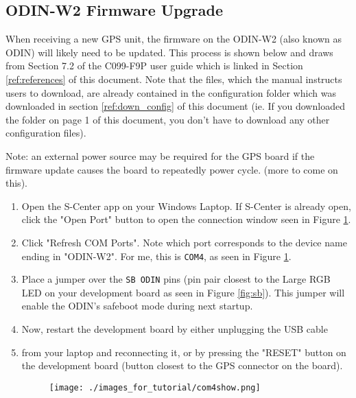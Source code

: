 \documentclass{article}%
\begin{document}
\begin{appendices}


\section{ODIN-W2 Firmware Upgrade}\label{ref:odin_firmware}
	When receiving a new GPS unit, the firmware on the ODIN-W2 (also known as ODIN) will likely need to be updated.  This process is shown below and draws from Section 7.2 of the C099-F9P user guide which is linked in Section \ref{ref:references} of this document.  Note that the files, which the manual instructs users to download, are already contained in the configuration folder which was downloaded in section \ref{ref:down_config} of this document (ie. If you downloaded the folder on page 1 of this document, you don't have to download any other configuration files).
	
	\begin{myquote}
	Note: an external power source may be required for the GPS board if the firmware update causes the board to repeatedly power cycle.	(more to come on this).
	\end{myquote}

	
	\begin{enumerate}
	\item Open the S-Center app on your Windows Laptop.  If S-Center is already open, click the "Open Port" button to open the connection window seen in Figure \ref{fig:com4show}.
	\item Click "Refresh COM Ports".  Note which port corresponds to the device name ending in "ODIN-W2".  For me, this is \texttt{COM4}, as seen in Figure \ref{fig:com4show}.
	\item Place a jumper over the \texttt{SB ODIN} pins (pin pair closest to the Large RGB LED on your development board as seen in Figure \ref{fig:sb}).  This jumper will enable the ODIN's safeboot mode during next startup.
	\item Now, restart the development board by either unplugging the USB cable 
	\item from your laptop and reconnecting it, or by pressing the "RESET" button on the development board (button closest to the GPS connector on the board).
	\begin{figure}
	  \centering
	  \texttt{[image: ./images\_for\_tutorial/com4show.png]}
	  \label{fig:com4show}
	\end{figure}
	

\end{enumerate}
\end{appendices}
\end{document}
